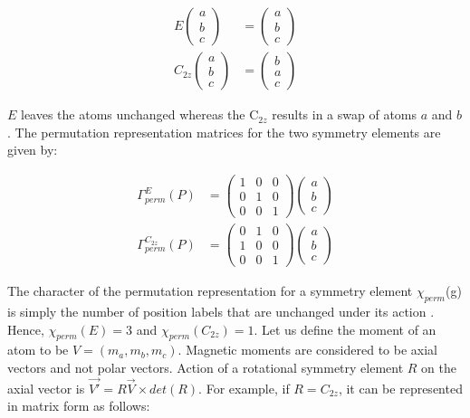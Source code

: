 \documentclass[letterpaper,10pt,doublespacing,edeposit]{uiucthesis2020}
\begin{document}
\begin{mainmatter}
\begin{align*}
E\begin{pmatrix}a\\b\\c\end{pmatrix} &= \begin{pmatrix}a\\b\\c\end{pmatrix} \\
C_{2z}\begin{pmatrix}a\\b\\c\end{pmatrix} &= \begin{pmatrix}b\\a\\c\end{pmatrix}
\end{align*}

$E$ leaves the atoms unchanged whereas the C$_{2z}$ results in a swap of atoms $a$ and $b$. The permutation representation matrices for the two symmetry elements are given by:

\begin{align*}
\Gamma_{perm}^E (P) &= \begin{pmatrix}1&0&0\\0&1&0\\0&0&1\end{pmatrix} \begin{pmatrix}a\\b\\c\end{pmatrix} \\
\Gamma_{perm}^{C_{2z}} (P) &= \begin{pmatrix}0&1&0\\1&0&0\\0&0&1\end{pmatrix} \begin{pmatrix}a\\b\\c\end{pmatrix}
\end{align*}

The character of the permutation representation for a symmetry element $\chi_{perm}$(g) is simply the number of position labels that are unchanged under its action \cite{Wills2001}. Hence, $\chi_{perm}(E) = 3$ and $\chi_{perm}(C_{2z}) = 1$. Let us define the moment of an atom to be $V = (m_a, m_b, m_c)$. Magnetic moments are considered to be axial vectors and not polar vectors. Action of a rotational symmetry element  $R$ on the axial vector is $\vec{V'} = R\vec{V} \times det(R)$. For example, if $R = C_{2z}$, it can be represented in matrix form as follows:


\end{mainmatter}
\end{document}
